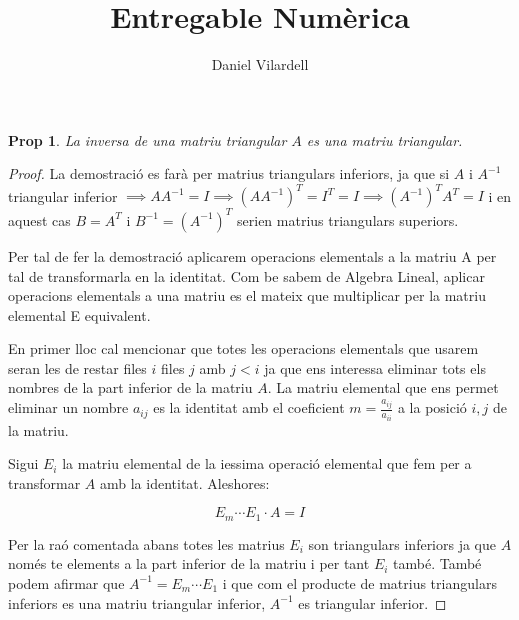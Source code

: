 \documentclass[12pt, a4papre]{article}
\author{Daniel Vilardell}
\title{Entregable Numèrica}
\date{}
\newtheorem*{lemma}{Prop}
\begin{document}
	\maketitle
	\begin{lemma} La inversa de una matriu triangular $A$ es una matriu triangular. \end{lemma}
	\begin{proof}
		La demostració es farà per matrius triangulars inferiors, ja que si $A$ i $A^{-1}$ triangular inferior $\implies AA^{-1} = I \implies (AA^{-1})^T = I^T = I \implies (A^{-1})^TA^T = I$ i en aquest cas $B=A^T$ i $B^{-1} = (A^{-1})^T$ serien matrius triangulars superiors.
		
		Per tal de fer la demostració aplicarem operacions elementals a la matriu A per tal de transformarla en la identitat. Com be sabem de Algebra Lineal, aplicar operacions elementals a una matriu es el mateix que multiplicar per la matriu elemental E equivalent.
		
		En primer lloc cal mencionar que totes les operacions elementals que usarem seran les de restar files $i$ files $j$ amb $j < i$ ja que ens interessa eliminar tots els nombres de la part inferior de la matriu $A$. La matriu elemental que ens permet eliminar un nombre $a_{ij}$ es la identitat amb el coeficient $m = \frac{a_{ij}}{a_{ii}}$ a la posició $i, j$ de la matriu. 
		
		Sigui $E_i$ la matriu elemental de la iessima operació elemental que fem per a transformar $A$ amb la identitat. Aleshores:
		
		\[
			E_m \cdots E_1 \cdot A = I
		\]
		
		Per la raó comentada abans totes les matrius $E_i$ son triangulars inferiors ja que $A$ només te elements a la part inferior de la matriu i per tant $E_i$ també. També podem afirmar que $A^{-1} = E_m \cdots E_1$ i que com el producte de matrius triangulars inferiors es una matriu triangular inferior, $A^{-1}$ es triangular inferior.
	\end{proof}
\end{document}
